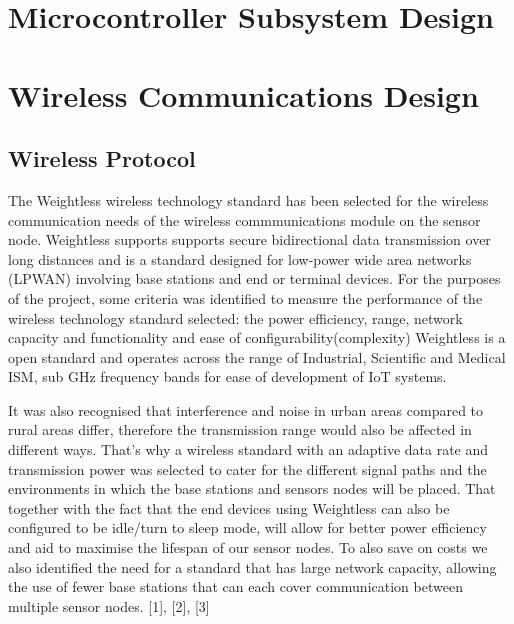\documentclass[12pt]{article}
\begin{document}
\section{Microcontroller Subsystem Design}

\section{Wireless Communications Design}

\subsection{Wireless Protocol}

The Weightless wireless technology standard has been selected for the wireless communication needs of the wireless commmunications module on the sensor node. Weightless supports supports secure bidirectional data transmission over long distances and is a standard designed for low-power wide area networks (LPWAN) involving base stations and end or terminal devices. For the purposes of the project, some criteria was identified to measure the performance of the wireless technology standard selected: the power efficiency, range, network capacity and  functionality and ease of configurability(complexity) Weightless is a open standard and operates across the range of Industrial, Scientific and Medical ISM, sub GHz  frequency bands for ease of development of IoT systems. 

It was also recognised that interference and noise in urban areas compared to rural areas differ, therefore the transmission range would also be affected in different ways. That's why a wireless standard with an adaptive data rate and transmission power was selected to cater for the different signal paths and the environments in which the base stations and sensors nodes will be placed. That together with the fact that the end devices using Weightless can also be configured to be idle/turn to sleep mode, will allow for better power efficiency and aid to maximise the lifespan of our sensor nodes. 
To also save on costs we also identified the need for a standard that has large network capacity, allowing the use of fewer base stations that can each cover communication between multiple sensor nodes.
[1], [2], [3]
\end{document}
